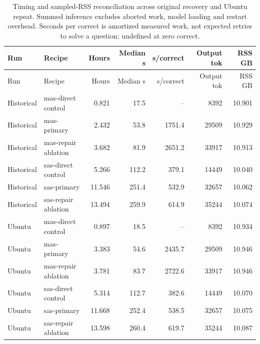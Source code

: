 \begin{longtable}{llrrrrr}
\caption{Timing and sampled-RSS reconciliation across original recovery and Ubuntu repeat. Summed inference excludes aborted work, model loading and restart overhead. Seconds per correct is amortized measured work, not expected retries to solve a question; undefined at zero correct.}\label{tab:resource-reconcile}\\
Run & Recipe & Hours & Median s & s/correct & Output tok & RSS GB\\\toprule\endfirsthead
Run & Recipe & Hours & Median s & s/correct & Output tok & RSS GB\\\toprule\endhead
Historical & mas-direct control & 0.821 & 17.5 & -- & 8392 & 10.901\\
Historical & mas-primary & 2.432 & 53.8 & 1751.4 & 29509 & 10.929\\
Historical & mas-repair ablation & 3.682 & 81.9 & 2651.2 & 33917 & 10.913\\
Historical & sas-direct control & 5.266 & 112.2 & 379.1 & 14449 & 10.040\\
Historical & sas-primary & 11.546 & 251.4 & 532.9 & 32657 & 10.062\\
Historical & sas-repair ablation & 13.494 & 259.9 & 614.9 & 35244 & 10.074\\
Ubuntu & mas-direct control & 0.897 & 18.5 & -- & 8392 & 10.934\\
Ubuntu & mas-primary & 3.383 & 54.6 & 2435.7 & 29509 & 10.946\\
Ubuntu & mas-repair ablation & 3.781 & 83.7 & 2722.6 & 33917 & 10.946\\
Ubuntu & sas-direct control & 5.314 & 112.7 & 382.6 & 14449 & 10.070\\
Ubuntu & sas-primary & 11.668 & 252.4 & 538.5 & 32657 & 10.075\\
Ubuntu & sas-repair ablation & 13.598 & 260.4 & 619.7 & 35244 & 10.087\\
\bottomrule\end{longtable}